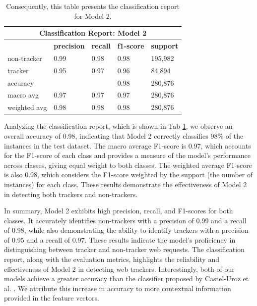 \begin{table}[ht!]
  \begin{center}
    \begin{tabular}[c]{|l|l|l|l|l|}
      \hline
      \multicolumn{5}{|c|}{\textbf{Classification Report: Model 2}} \\
      \hline
      \textbf{} & \textbf{precision} & \textbf{recall} & \textbf{f1-score} & \textbf{support} \\
      \hline
      non-tracker & 0.99 & 0.98 & 0.98 & 195,982 \\
      \hline
      tracker & 0.95 & 0.97 & 0.96 & 84,894 \\
      \hline
      accuracy & & & 0.98 & 280,876 \\
      \hline
      macro avg & 0.97 & 0.97 & 0.97 & 280,876 \\
      \hline
      weighted avg & 0.98 & 0.98 & 0.98 & 280,876 \\
      
      \hline
    \end{tabular}
  \end{center}

  \caption{Consequently, this table presents the classification report for Model 2.}
  \label{tab:m2}
\end{table}
Analyzing the classification report, which is shown in Tab-\ref{tab:m2}, we observe an overall accuracy of 0.98, indicating that Model 2 correctly
classifies 98\% of the instances in the test dataset. The macro average F1-score is 0.97, which accounts for the F1-score
of each class and provides a measure of the model's performance across classes, giving equal weight to both classes. The
weighted average F1-score is also 0.98, which considers the F1-score weighted by the support (the number of instances) for
each class. These results demonstrate the effectiveness of Model 2 in detecting both trackers and non-trackers.

In summary, Model 2 exhibits high precision, recall, and F1-scores for both classes. It accurately identifies non-trackers
with a precision of 0.99 and a recall of 0.98, while also demonstrating the ability to identify trackers with a precision
of 0.95 and a recall of 0.97. These results indicate the model's proficiency in distinguishing between tracker and non-tracker
web requests. The classification report, along with the evaluation metrics, highlights the reliability and effectiveness of Model 2
in detecting web trackers. Interestingly, both of our models achieve a greater accuracy than the classifier proposed by Castel-Uroz et al.
\cite{castell2020url}. We attribute this increase in accuracy to more contextual information provided in the feature vectors.

